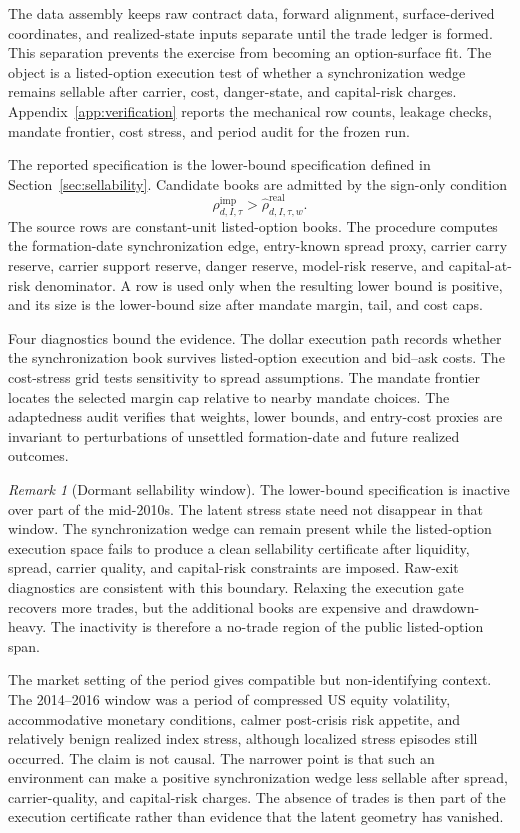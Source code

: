 \documentclass[11pt,a4paper]{amsart}
\theoremstyle{plain}
\theoremstyle{definition}
\theoremstyle{remark}
\newtheorem{remark}[theorem]{Remark}
\begin{document}
The data assembly keeps raw contract data, forward alignment, surface-derived coordinates, and
realized-state inputs separate until the trade ledger is formed.  This separation prevents the
exercise from becoming an option-surface fit.  The object is a listed-option execution test of
whether a synchronization wedge remains sellable after carrier, cost, danger-state, and
capital-risk charges.  Appendix~\ref{app:verification} reports the mechanical row counts, leakage
checks, mandate frontier, cost stress, and period audit for the frozen run.

The reported specification is the lower-bound specification defined in Section~\ref{sec:sellability}.  Candidate
books are admitted by the sign-only condition
\[
        \rho^{\mathrm{imp}}_{d,I,\tau}>\widehat\rho^{\mathrm{real}}_{d,I,\tau,w}.
\]
The source rows are constant-unit listed-option books.  The procedure computes the formation-date
synchronization edge, entry-known spread proxy, carrier carry reserve, carrier support reserve,
danger reserve, model-risk reserve, and capital-at-risk denominator.  A row is used only when the
resulting lower bound is positive, and its size is the lower-bound size after mandate margin, tail,
and cost caps.

Four diagnostics bound the evidence.  The dollar execution path records whether the
synchronization book survives listed-option execution and bid--ask costs.  The cost-stress grid
tests sensitivity to spread assumptions.  The mandate frontier locates the selected margin cap
relative to nearby mandate choices.  The adaptedness audit verifies that weights, lower bounds,
and entry-cost proxies are invariant to perturbations of unsettled formation-date and future
realized outcomes.

\begin{remark}[Dormant sellability window]
The lower-bound specification is inactive over part of the mid-2010s.  The latent stress state need
not disappear in that window.  The synchronization wedge can remain present while the
listed-option execution space fails to produce a clean sellability certificate after liquidity,
spread, carrier quality, and capital-risk constraints are imposed.  Raw-exit diagnostics are
consistent with this boundary.  Relaxing the execution gate recovers more trades, but the
additional books are expensive and drawdown-heavy.  The inactivity is therefore a no-trade region
of the public listed-option span.

The market setting of the period gives compatible but non-identifying context.  The 2014--2016
window was a period of compressed US equity volatility, accommodative monetary conditions, calmer
post-crisis risk appetite, and relatively benign realized index stress, although localized stress
episodes still occurred.  The claim is not causal.  The narrower point is that such an environment
can make a positive synchronization wedge less sellable after spread, carrier-quality, and
capital-risk charges.  The absence of trades is then part of the execution certificate rather than
evidence that the latent geometry has vanished.
\end{remark}
\end{document}
